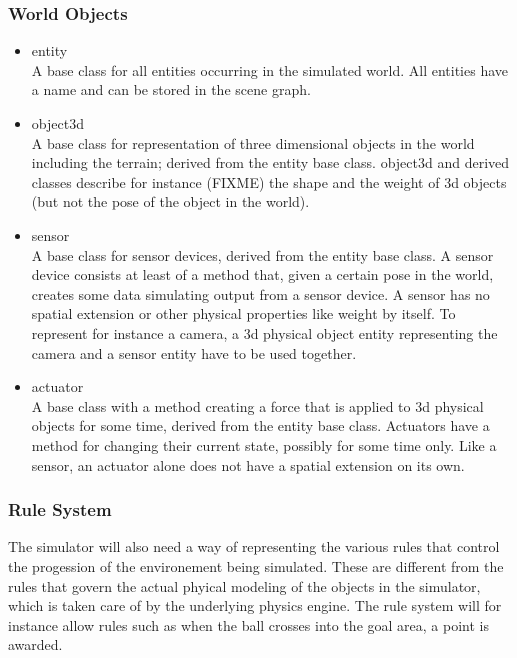 \documentclass[a4paper,12pt]{article}
\begin{document}
\subsubsection{World Objects}

\begin{itemize}
\item entity\\
  A base class for all entities occurring in the simulated world. All
  entities have a name and can be stored in the scene graph.

\item object3d\\
  A base class for representation of three dimensional objects in the
  world including the terrain; derived from the entity base class. object3d and derived
  classes describe for instance (FIXME) the shape and the weight of 3d
  objects (but not the pose of the object in the world).

\item sensor\\
  A base class for sensor devices, derived from the entity base class.
  A sensor device consists at least of a method that, given a certain
  pose in the world, creates some data simulating output from a sensor
  device. A sensor has no spatial extension or other physical
  properties like weight by itself. To represent for instance a
  camera, a 3d physical object entity representing the camera and a
  sensor entity have to be used together.

\item actuator\\
  A base class with a method creating a force that is applied to 3d
  physical objects for some time, derived from the entity base class.
  Actuators have a method for changing their current state, possibly
  for some time only. Like a sensor, an actuator alone does not have a
  spatial extension on its own.
\end{itemize}



\subsubsection{Rule System}

The simulator will also need a way of representing the various rules that
control the progession of the environement being simulated.  These are
different from the rules that govern the actual phyical modeling of the objects
in the simulator, which is taken care of by the underlying physics engine.
The rule system will for instance allow rules such as when the ball crosses into
the goal area, a point is awarded.
\end{document}
